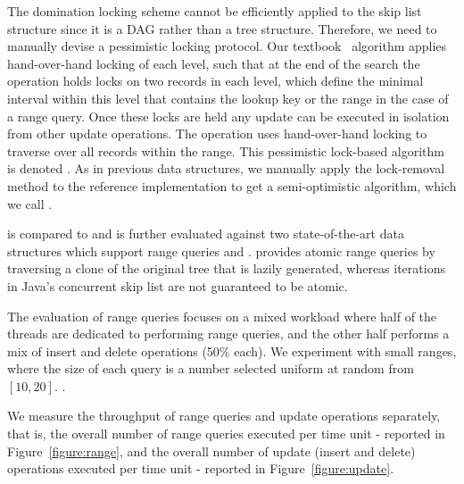 The domination locking scheme cannot be efficiently applied to the skip list
structure since it is a DAG rather than a tree structure. Therefore, we need to
manually devise a pessimistic locking protocol. Our
textbook~\cite{HerlihyS2008} algorithm applies hand-over-hand locking of each
level, such that at the end of the search the operation holds locks on two
records in each level, which define the minimal interval within this level that
contains the lookup key or the range in the case of a range query. 
Once these locks are held any update can be executed in isolation from other
update operations. The operation uses hand-over-hand locking to traverse over
all records within the range. This pessimistic lock-based algorithm
is denoted \domSkiplist. As in previous data structures, we manually apply the
lock-removal method to the reference implementation to get a semi-optimistic algorithm, which we call \autoSkiplist.

\autoSkiplist is compared to \domSkiplist and is further evaluated against two
state-of-the-art data structures which support range queries \bronson and \skiplist.
\bronson provides atomic range queries by traversing a clone of the
original tree that is lazily generated,
whereas iterations in Java's concurrent skip list are not
guaranteed to be atomic.

The evaluation of range queries focuses on a mixed workload where half of the
threads are dedicated to performing range queries, and the other half performs a
mix of insert and delete operations (50\% each).  We experiment with small
ranges, where the size of each query is a number selected uniform at random
from $[10,20]$.  . 

We measure the throughput of range queries and update operations separately,
that is, the overall number of range queries executed per time unit - reported
in Figure~\ref{figure:range}, and the overall number of update (insert and
delete) operations executed per time unit - reported in Figure~\ref{figure:update}.
